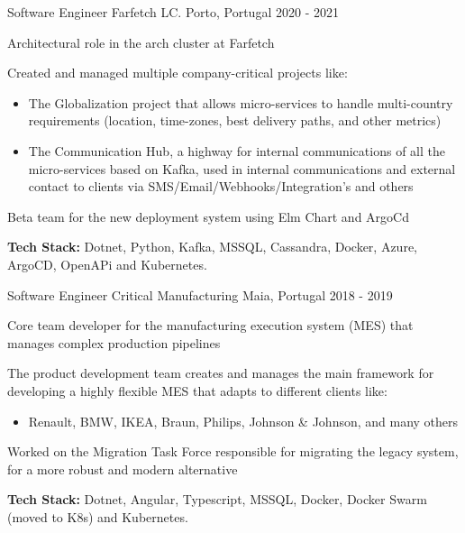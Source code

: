 \begin{cventries}
  \cventry
    {Software Engineer} %
    {Farfetch LC.} %
    {Porto, Portugal} %
    {2020 - 2021} %
    {
      \begin{cvitems} %
        \item {Architectural role in the arch cluster at Farfetch}
        \item {Created and managed multiple company-critical projects like:}
        \begin{itemize}
         \item The Globalization project that allows micro-services to handle multi-country requirements (location, time-zones, best delivery paths, and other metrics)
         \item The Communication Hub, a highway for internal communications of all the micro-services based on Kafka, used in internal communications and external contact to clients via SMS/Email/Webhooks/Integration's and others
        \end{itemize}
        \item Beta team for the new deployment system using Elm Chart and ArgoCd
        \item {\textbf{Tech Stack:} Dotnet, Python, Kafka, MSSQL, Cassandra, Docker, Azure, ArgoCD, OpenAPi and Kubernetes.}
      \end{cvitems}
    }

  \cventry
    {Software Engineer} %
    {Critical Manufacturing} %
    {Maia, Portugal} %
    {2018 - 2019} %
    {
      \begin{cvitems} %
        \item {Core team developer for the manufacturing execution system (MES) that manages complex production pipelines}
        \item {The product development team creates and manages the main framework for
developing a highly flexible MES that adapts to different clients like:}
        \begin{itemize}
         \item Renault, BMW, IKEA, Braun, Philips, Johnson \& Johnson, and many others 
        \end{itemize}
        \item Worked on the Migration Task Force responsible for migrating the legacy system, for a more robust and modern alternative
        \item {\textbf{Tech Stack:} Dotnet, Angular, Typescript, MSSQL, Docker, Docker Swarm (moved to K8s) and Kubernetes.}
      \end{cvitems}
    }


\end{cventries}
